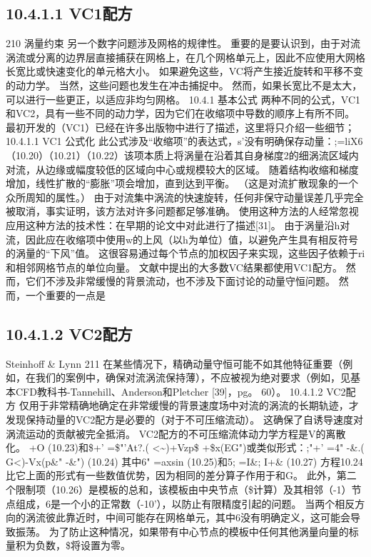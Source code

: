 \documentclass[UTF8,11pt,a4paper,openany,fontset=fandol]{ctexbook}
\begin{document}
\subsection{10.4.1.1 VC1配方}
210 涡量约束 另一个数字问题涉及网格的规律性。 重要的是要认识到，由于对流涡流或分离的边界层直接捕获在网格上，在几个网格单元上，因此不应使用大网格长宽比或快速变化的单元格大小。 如果避免这些，VC将产生接近旋转和平移不变的动力学。 当然，这些问题也发生在冲击捕捉中。 然而，如果长宽比不是太大，可以进行一些更正，以适应非均匀网格。 10.4.1 基本公式 两种不同的公式，VC1和VC2，具有一些不同的动力学，因为它们在收缩项中导数的顺序上有所不同。 最初开发的（VC1）已经在许多出版物中进行了描述，这里将只介绍一些细节；10.4.1.1 VC1 公式化 此公式涉及“收缩项”的表达式，s'没有明确保存动量：;=liX6（10.20）（10.21）（10.22）该项本质上将涡量在沿着其自身梯度2的细涡流区域内对流，从边缘或幅度较低的区域向中心或规模较大的区域。 随着结构收缩和梯度增加，线性扩散的“膨胀”项会增加，直到达到平衡。 （这是对流扩散现象的一个众所周知的属性。） 由于对流集中涡流的快速旋转，任何非保守动量误差几乎完全被取消，事实证明，该方法对许多问题都足够准确。 使用这种方法的人经常忽视应用这种方法的技术性：在早期的论文中对此进行了描述[31]。 由于涡量沿h对流，因此应在收缩项中使用w的上风（以h为单位）值，以避免产生具有相反符号的涡量的“下风”值。 这很容易通过每个节点的加权因子来实现，这些因子依赖于ri和相邻网格节点的单位向量。 文献中提出的大多数VC结果都使用VC1配方。 然而，它们不涉及非常缓慢的背景流动，也不涉及下面讨论的动量守恒问题。 然而，一个重要的一点是

\subsection{10.4.1.2 VC2配方}
Steinhoff \& Lynn 211 在某些情况下，精确动量守恒可能不如其他特征重要（例如，在我们的案例中，确保对流涡流保持薄），不应被视为绝对要求（例如，见基本CFD教科书-Tannehill、Anderson和Pletcher [39]，pg。 60）。 10.4.1.2 VC2配方 仅用于非常精确地确定在非常缓慢的背景速度场中对流的涡流的长期轨迹，才发现保持动量的VC2配方是必要的（对于不可压缩流动）。 这确保了自诱导速度对涡流运动的贡献被完全抵消。 VC2配方的不可压缩流体动力学方程是V的离散化。 +O (10.23)和\$+' =\$"'At?.( <\textasciitilde{})+Vzp\$ +\$x(EG")或类似形式：;"+' =4" -\&.( G<)-Vx(p\&" -\&") (10.24) 其中6" =axsin (10.25)和5; =I\&; I+\& (10.27) 方程10.24比它上面的形式有一些数值优势，因为相同的差分算子作用于和G。 此外，第二个限制项（10.26）是模板的总和，该模板由中央节点（\$计算）及其相邻（-1）节点组成，6是一个小的正常数（-10'），以防止有限精度引起的问题。 当两个相反方向的涡流彼此靠近时，中间可能存在网格单元，其中6没有明确定义，这可能会导致振荡。 为了防止这种情况，如果带有中心节点的模板中任何其他涡量向量的标量积为负数，\$将设置为零。
\end{document}
